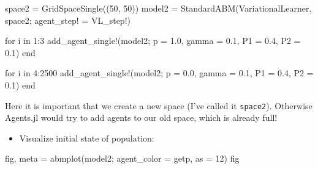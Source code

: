 \documentclass[
  letterpaper,
  DIV=11,
  numbers=noendperiod]{scrartcl}
\newenvironment{Shaded}{\begin{snugshade}}{\end{snugshade}}
\newcommand{\ControlFlowTok}[1]{\textcolor[rgb]{0.00,0.23,0.31}{#1}}
\newcommand{\FloatTok}[1]{\textcolor[rgb]{0.68,0.00,0.00}{#1}}
\newcommand{\FunctionTok}[1]{\textcolor[rgb]{0.28,0.35,0.67}{#1}}
\newcommand{\KeywordTok}[1]{\textcolor[rgb]{0.00,0.23,0.31}{#1}}
\newcommand{\NormalTok}[1]{\textcolor[rgb]{0.00,0.23,0.31}{#1}}
\newcommand{\OperatorTok}[1]{\textcolor[rgb]{0.37,0.37,0.37}{#1}}
\providecommand{\tightlist}{%
  \setlength{\itemsep}{0pt}\setlength{\parskip}{0pt}}\usepackage{longtable,booktabs,array}
\begin{document}
\begin{Shaded}
\begin{Highlighting}[]
\NormalTok{space2 }\OperatorTok{=} \FunctionTok{GridSpaceSingle}\NormalTok{((}\FloatTok{50}\NormalTok{, }\FloatTok{50}\NormalTok{))}
\NormalTok{model2 }\OperatorTok{=} \FunctionTok{StandardABM}\NormalTok{(VariationalLearner, space2;}
\NormalTok{                     agent\_step! }\OperatorTok{=}\NormalTok{ VL\_step!)}

\ControlFlowTok{for}\NormalTok{ i }\KeywordTok{in} \FloatTok{1}\OperatorTok{:}\FloatTok{3}
  \FunctionTok{add\_agent\_single!}\NormalTok{(model2; p }\OperatorTok{=} \FloatTok{1.0}\NormalTok{, gamma }\OperatorTok{=} \FloatTok{0.1}\NormalTok{, }
\NormalTok{                    P1 }\OperatorTok{=} \FloatTok{0.4}\NormalTok{, P2 }\OperatorTok{=} \FloatTok{0.1}\NormalTok{)}
\ControlFlowTok{end}

\ControlFlowTok{for}\NormalTok{ i }\KeywordTok{in} \FloatTok{4}\OperatorTok{:}\FloatTok{2500}
  \FunctionTok{add\_agent\_single!}\NormalTok{(model2; p }\OperatorTok{=} \FloatTok{0.0}\NormalTok{, gamma }\OperatorTok{=} \FloatTok{0.1}\NormalTok{, }
\NormalTok{                    P1 }\OperatorTok{=} \FloatTok{0.4}\NormalTok{, P2 }\OperatorTok{=} \FloatTok{0.1}\NormalTok{)}
\ControlFlowTok{end}
\end{Highlighting}
\end{Shaded}

\begin{tcolorbox}[enhanced jigsaw, breakable, title=\textcolor{quarto-callout-important-color}{\faExclamation}\hspace{0.5em}{Important}, bottomrule=.15mm, coltitle=black, toprule=.15mm, titlerule=0mm, colframe=quarto-callout-important-color-frame, toptitle=1mm, opacityback=0, colbacktitle=quarto-callout-important-color!10!white, rightrule=.15mm, bottomtitle=1mm, arc=.35mm, leftrule=.75mm, opacitybacktitle=0.6, colback=white, left=2mm]

Here it is important that we create a new space (I've called it
\texttt{space2}). Otherwise Agents.jl would try to add agents to our old
space, which is already full!

\end{tcolorbox}

\begin{itemize}
\tightlist
\item
  Visualize initial state of population:
\end{itemize}

\begin{Shaded}
\begin{Highlighting}[]
\NormalTok{fig, meta }\OperatorTok{=} \FunctionTok{abmplot}\NormalTok{(model2; agent\_color }\OperatorTok{=}\NormalTok{ getp, as }\OperatorTok{=} \FloatTok{12}\NormalTok{)}
\NormalTok{fig}
\end{Highlighting}
\end{Shaded}
\end{document}
